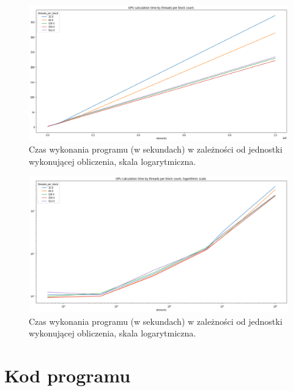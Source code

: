 \documentclass{article}
\begin{document}
        \begin{figure}[htb]
            \centering
            \includegraphics[width=\textwidth]{images/gpu_times.png}
            \caption{Czas wykonania programu (w sekundach) w zależności od jednostki wykonującej obliczenia, skala logarytmiczna.}
        \end{figure}

        \begin{figure}[htb]
            \centering
            \includegraphics[width=\textwidth]{images/gpu_times_log.png}
            \caption{Czas wykonania programu (w sekundach) w zależności od jednostki wykonującej obliczenia, skala logarytmiczna.}
        \end{figure}

        \clearpage
    \section{Kod programu}
        
\end{document}

